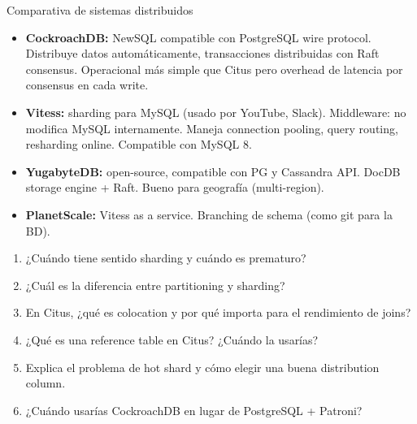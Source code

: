 \begin{teoriabox}{Comparativa de sistemas distribuidos}
\begin{itemize}
  \item \textbf{CockroachDB:} NewSQL compatible con PostgreSQL wire protocol. Distribuye datos automáticamente, transacciones distribuidas con Raft consensus. Operacional más simple que Citus pero overhead de latencia por consensus en cada write.
  \item \textbf{Vitess:} sharding para MySQL (usado por YouTube, Slack). Middleware: no modifica MySQL internamente. Maneja connection pooling, query routing, resharding online. Compatible con MySQL 8.
  \item \textbf{YugabyteDB:} open-source, compatible con PG y Cassandra API. DocDB storage engine + Raft. Bueno para geografía (multi-region).
  \item \textbf{PlanetScale:} Vitess as a service. Branching de schema (como git para la BD).
\end{itemize}
\end{teoriabox}

\begin{entrevistabox}
\begin{enumerate}
  \item ¿Cuándo tiene sentido sharding y cuándo es prematuro?
  \item ¿Cuál es la diferencia entre partitioning y sharding?
  \item En Citus, ¿qué es colocation y por qué importa para el rendimiento de joins?
  \item ¿Qué es una reference table en Citus? ¿Cuándo la usarías?
  \item Explica el problema de hot shard y cómo elegir una buena distribution column.
  \item ¿Cuándo usarías CockroachDB en lugar de PostgreSQL + Patroni?
\end{enumerate}
\end{entrevistabox}
